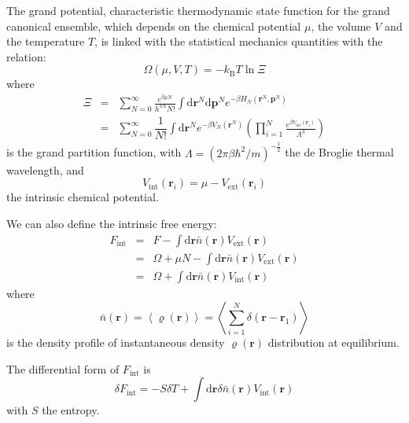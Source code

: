 The grand potential, characteristic thermodynamic state function for
the grand canonical ensemble, which depends on the chemical potential
$\mu$, the volume $V$ and the temperature $T$, is linked with the
statistical mechanics quantities with the relation:
\begin{equation}
\varOmega(\mu,V,T)=-k_{\mathrm{B}}T\ln\varXi\label{eq:1.2}
\end{equation}
where
\begin{eqnarray}
\varXi & = & \sum_{N=0}^{\infty}\frac{e^{\beta\mu N}}{h^{3N}N!}\int\mathrm{d}\mathbf{r}^{N}\mathrm{d}\mathbf{p}^{N}e^{-\beta H_{N}(\mathbf{r}^{N},\mathbf{p}^{N})}\\
 & = & \sum_{N=0}^{\infty}\dfrac{\text{1}}{N!}\int\mathrm{d}\mathbf{r}^{N}e^{-\beta V_{N}(\mathbf{r}^{N})}\left(\prod_{i=1}^{N}\frac{e^{\beta V_{\mathrm{int}}(\mathbf{r}_{i})}}{\Lambda^{3}}\right)
\end{eqnarray}
 is the grand partition function, with $\Lambda=\left(2\pi\beta\hbar^{2}/m\right)^{-\frac{1}{2}}$
the de Broglie thermal wavelength, and
\begin{equation}
V_{\mathrm{int}}(\mathbf{r}_{i})=\mu-V_{\mathrm{ext}}(\mathbf{r}_{i})\label{eq:1.5}
\end{equation}
the intrinsic chemical potential. 

We can also define the intrinsic free energy: 
\begin{eqnarray}
F_{\mathrm{int}} & = & F-\int\mathrm{d}\mathbf{r}\bar{n}(\mathbf{r})V_{\mathrm{ext}}(\mathbf{r})\nonumber \\
 & = & \varOmega+\mu N-\int\mathrm{d}\mathbf{r}\bar{n}(\mathbf{r})V_{\mathrm{ext}}(\mathbf{r})\nonumber \\
 & = & \varOmega+\int\mathrm{d}\mathbf{r}\bar{n}(\mathbf{r})V_{\mathrm{int}}(\mathbf{r})\label{eq:1.f-int}
\end{eqnarray}
where 
\begin{equation}
\bar{n}(\mathbf{r})=\left\langle \varrho(\mathbf{r})\right\rangle =\left\langle \sum_{i=1}^{N}\delta(\mathbf{r}-\mathbf{r}_{1})\right\rangle 
\end{equation}
is the density profile of instantaneous density $\varrho(\mathbf{r})$
distribution at equilibrium.

The differential form of $F_{\mathrm{int}}$ is
\begin{equation}
\delta F_{\mathrm{int}}=-S\delta T+\int\mathrm{d}\mathbf{r}\delta\bar{n}(\mathbf{r})V_{\mathrm{int}}(\mathbf{r})\label{eq:delta-f-int}
\end{equation}
with $S$ the entropy.

